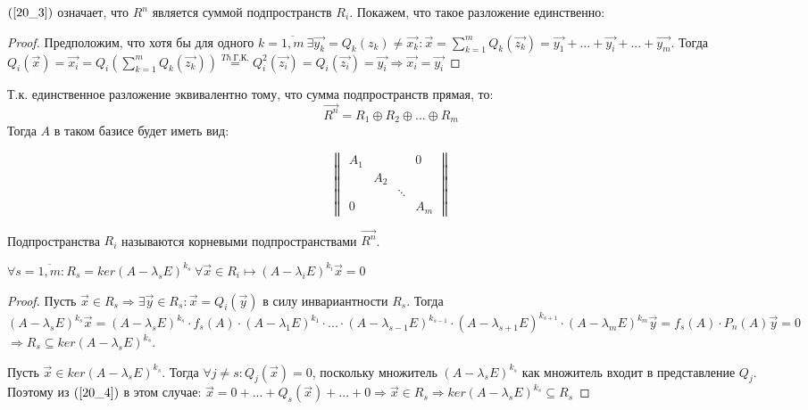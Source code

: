 \documentclass[a4paper, 12pt]{article}
\begin{document}
$(\ref{20_3})$ означает, что $R^n$ является суммой подпространств $R_i$. Покажем, что такое разложение единственно:
\begin{proof}
Предположим, что хотя бы для одного $k = \overline{1,m}~ \exists \vec{y_k} = Q_k(z_k) \neq \vec{x_k} : \vec{x} = \sum\limits_{k=1}^m{Q_k(\vec{z_k})} = \vec{y_1} + ... + \vec{y_i} + ... + \vec{y_m}$. Тогда $Q_i(\vec{x}) = \vec{x_i} = Q_i \left(\sum\limits_{k=1}^m{Q_k(\vec{z_k})}\right) \stackrel{Th~ \text{Г.К.}}{=} Q_i^2(\vec{z_i}) = Q_i(\vec{z_i}) = \vec{y_i} \Rightarrow \vec{x_i} = \vec{y_i}$
\end{proof}

Т.к. единственное разложение эквивалентно тому, что сумма подпространств прямая, то:
\[\vec{R^n} = R_1 \oplus R_2 \oplus ... \oplus R_m\]
Тогда $A$ в таком базисе будет иметь вид:

\begin{equation}
\begin{Vmatrix}
  A_1 &     &        & 0   \\
      & A_2 &        &     \\
      &     & \ddots &     \\
  0   &     &        & A_m
\end{Vmatrix}
\end{equation}

Подпространства $R_i$ называются корневыми подпространствами $\vec{R^n}$.

\begin{theorem}
$\forall s = \overline{1,m} : R_s = ker(A - \lambda_s E)^{k_s}~ \forall \vec{x} \in R_i \longmapsto (A - \lambda_i E)^{k_i} \vec{x} = 0$
\begin{proof}
Пусть $\vec{x} \in R_s \Rightarrow \exists \vec{y} \in R_s : \vec{x} = Q_i(\vec{y})$ в силу инвариантности $R_s$. Тогда $(A - \lambda_s E)^{k_s} \vec{x} = (A - \lambda_s E)^{k_s} \cdot f_s(A) \cdot (A - \lambda_1 E)^{k_1} \cdot ... \cdot (A - \lambda_{s-1} E)^{k_{s-1}} \cdot (A - \lambda_{s+1} E)^{k_{s+1}} \cdot (A - \lambda_m E)^{k_m} \vec{y} = f_s(A) \cdot P_n(A)\vec{y} = 0$
$ \Rightarrow R_s \subseteq ker(A - \lambda_s E) ^ {k_s}$.

Пусть $\vec{x} \in ker(A - \lambda_s E)^{k_s}$. Тогда $\forall j \neq s: Q_j(\vec{x}) = 0$, поскольку множитель $(A - \lambda_s E)^{k_s}$ как множитель входит в представление $Q_j$. Поэтому из $(\ref{20_4})$ в этом случае: $\vec{x} = 0 + ... + Q_s(\vec{x}) + ... + 0 \Rightarrow \vec{x} \in R_s \Rightarrow ker(A-\lambda_s E)^{k_s} \subseteq R_s$
\end{proof}
\end{theorem}
\end{document}
